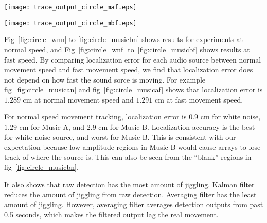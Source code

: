 \begin{figure*}[]
\centering
  \texttt{[image: trace\_output\_circle\_maf.eps]}
  \caption{music A ($20$ cm per second)}
  \label{fig:circle_musicaf}
\end{figure*}

\begin{figure*}[]
\centering
  \texttt{[image: trace\_output\_circle\_mbf.eps]}
  \caption{music B ($20$ cm per second)}
  \label{fig:circle_musicbf}
\end{figure*}

Fig~\ref{fig:circle_wnn} to \ref{fig:circle_musicbn} shows results for experiments at normal speed, and Fig~\ref{fig:circle_wnf} to~\ref{fig:circle_musicbf} shows results at fast speed. By comparing localization error for each audio source between normal movement speed and fast movement speed, we find that localization error does not depend on how fast the sound sorce is moving. For example fig~\ref{fig:circle_musican} and fig~\ref{fig:circle_musicaf} shows that localization error is $1.289$ cm at normal movement speed and $1.291$ cm at fast movement speed.

For normal speed movement tracking, localization error is $0.9$ cm for white noise, $1.29$ cm for Music A, and $2.9$ cm for Music B. Localization accuracy is the best for white noise source, and worst for Music B. This is consistent with our expectation because low amplitude regions in Music B would cause arrays to lose track of where the source is. This can also be seen from the ``blank'' regions in fig~\ref{fig:circle_musicbn}.

It also shows that raw detection has the most amount of jiggling. Kalman filter reduces the amount of jiggling from raw detection. Averaging filter has the least amount of jiggling. However, averaging filter averages detection outputs from past 0.5 seconds, which makes the filtered output lag the real movement. 
